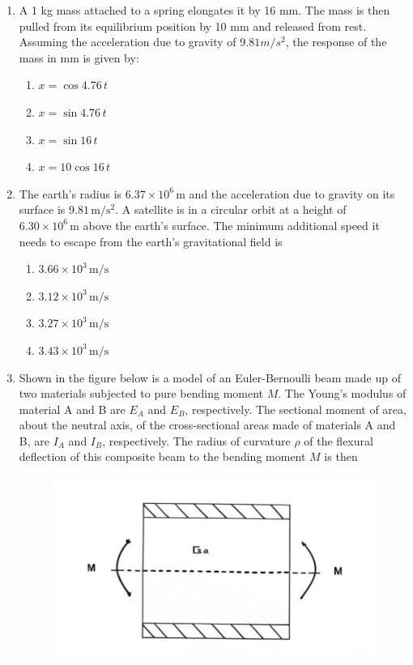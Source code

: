 \documentclass{article}
\begin{document}
\begin{enumerate}
    \item A 1 kg mass attached to a spring elongates it by 16 mm. The mass is then pulled from its equilibrium position by 10 mm and released from rest. Assuming the acceleration due to gravity of $9.81 m/s^2$, the response of the mass in mm is given by: 
    \begin{enumerate}
        \item $x = \cos 4.76 \, t$
        \item $x = \sin 4.76 \, t$
        \item $x = \sin 16 \, t$
        \item $x = 10 \cos 16 \, t$ 
    \end{enumerate}
        

    \item The earth's radius is $6.37 \times 10^6 \, \mathrm{m}$ and the acceleration due to gravity on its surface is $9.81 \, \mathrm{m/s^2}$. A satellite is in a circular orbit at a height of $6.30 \times 10^6 \, \mathrm{m}$ above the earth's surface. The minimum additional speed it needs to escape from the earth's gravitational field is 
    \begin{multicols}{4}
    \begin{enumerate}
        \item $3.66 \times 10^3 \, \mathrm{m/s}$ 
        \item $3.12 \times 10^3 \, \mathrm{m/s}$ 
        \item $3.27 \times 10^3 \, \mathrm{m/s}$ 
        \item $3.43 \times 10^3 \, \mathrm{m/s}$ 
    \end{enumerate}
    \end{multicols}
        
\newpage
    \item Shown in the figure below is a model of an Euler-Bernoulli beam made up of two materials subjected to pure bending moment $M$. The Young's modulus of material A and B are $E_A$ and $E_B$, respectively. The sectional moment of area, about the neutral axis, of the cross-sectional areas made of materials A and B, are $I_A$ and $I_B$, respectively. The radius of curvature $\rho$ of the flexural deflection of this composite beam to the bending moment $M$ is then
        \begin{figure}[H]
            \centering
            \includegraphics[width=0.5\linewidth]{figs/q25.jpg}
            \caption{}
            \label{}
        \end{figure}



\end{enumerate}
\end{document}

